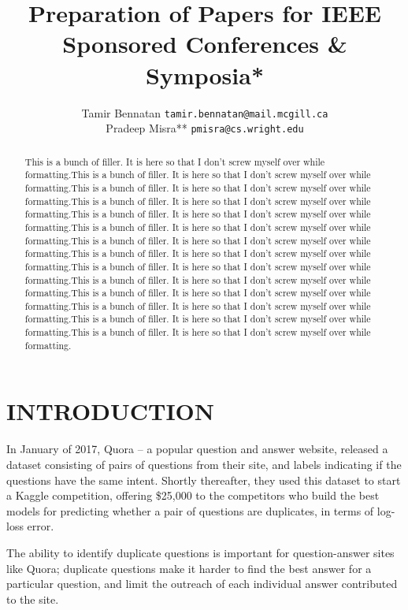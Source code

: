 \documentclass[letterpaper, 10 pt, conference]{ieeeconf}  %
\title{\LARGE \bf
Preparation of Papers for IEEE Sponsored Conferences \& Symposia*
}
\author{ \parbox{3 in}{\centering Tamir Bennatan
         {\tt\small tamir.bennatan@mail.mcgill.ca}}
         \hspace*{ 0.5 in}
         \parbox{3 in}{ \centering Pradeep Misra**
         {\tt\small pmisra@cs.wright.edu}}
}
\begin{document}
\maketitle
\thispagestyle{empty}
\pagestyle{empty}


\begin{abstract}

This is a bunch of filler. It is here so that I don't screw myself over while formatting.This is a bunch of filler. It is here so that I don't screw myself over while formatting.This is a bunch of filler. It is here so that I don't screw myself over while formatting.This is a bunch of filler. It is here so that I don't screw myself over while formatting.This is a bunch of filler. It is here so that I don't screw myself over while formatting.This is a bunch of filler. It is here so that I don't screw myself over while formatting.This is a bunch of filler. It is here so that I don't screw myself over while formatting.This is a bunch of filler. It is here so that I don't screw myself over while formatting.This is a bunch of filler. It is here so that I don't screw myself over while formatting.This is a bunch of filler. It is here so that I don't screw myself over while formatting.This is a bunch of filler. It is here so that I don't screw myself over while formatting.This is a bunch of filler. It is here so that I don't screw myself over while formatting.This is a bunch of filler. It is here so that I don't screw myself over while formatting.This is a bunch of filler. It is here so that I don't screw myself over while formatting.

\end{abstract}


\section{INTRODUCTION}

In January of 2017, Quora – a popular question and answer website, released a dataset consisting of pairs of questions from their site, and labels indicating if the questions have the same intent. Shortly thereafter, they used this dataset to start a Kaggle competition, offering \$25,000 to the competitors who build the best models for predicting whether a pair of questions are duplicates, in terms of log-loss error. 

The ability to identify duplicate questions is important for question-answer sites like Quora; duplicate questions make it harder to find the best answer for a particular question, and limit the outreach of each individual answer contributed to the site.
\end{document}
